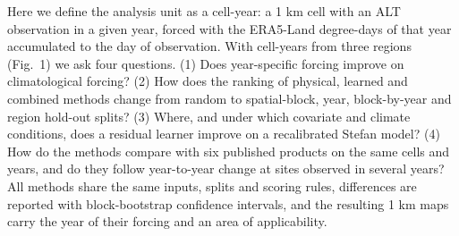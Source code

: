 Here we define the analysis unit as a cell-year: a 1 km cell with an ALT observation in a given year, forced with the ERA5-Land degree-days of that year accumulated to the day of observation\cite{munozsabater2021_era5_land}. With \nncyAll{} cell-years from three regions (Fig.~1) we ask four questions. (1) Does year-specific forcing improve on climatological forcing? (2) How does the ranking of physical, learned and combined methods change from random to spatial-block, year, block-by-year and region hold-out splits? (3) Where, and under which covariate and climate conditions, does a residual learner improve on a recalibrated Stefan model? (4) How do the methods compare with six published products on the same cells and years, and do they follow year-to-year change at sites observed in several years? All methods share the same inputs, splits and scoring rules, differences are reported with block-bootstrap confidence intervals, and the resulting 1 km maps carry the year of their forcing and an area of applicability.
